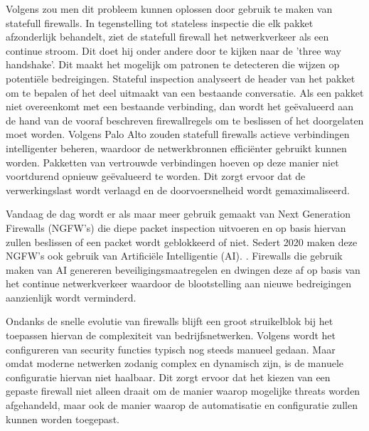 Volgens \textcite{paloAltoSF2025} zou men dit probleem kunnen oplossen door gebruik te maken van statefull firewalls. In tegenstelling tot stateless inspectie die elk pakket afzonderlijk behandelt, ziet de statefull firewall het netwerkverkeer als een continue stroom. Dit doet hij onder andere door te kijken naar de 'three way handshake'. Dit maakt het mogelijk om patronen te detecteren die wijzen op potentiële bedreigingen. Stateful inspection analyseert de header van het pakket om te bepalen of het deel uitmaakt van een bestaande conversatie. Als een pakket niet overeenkomt met een bestaande verbinding, dan wordt het geëvalueerd aan de hand van de vooraf beschreven firewallregels om te beslissen of het doorgelaten moet worden. Volgens Palo Alto zouden statefull firewalls actieve verbindingen intelligenter beheren, waardoor de netwerkbronnen efficiënter gebruikt kunnen worden. Pakketten van vertrouwde verbindingen hoeven op deze manier niet voortdurend opnieuw geëvalueerd te worden. Dit zorgt ervoor dat de verwerkingslast wordt verlaagd en de doorvoersnelheid wordt gemaximaliseerd. 

Vandaag de dag wordt er als maar meer gebruik gemaakt van Next Generation Firewalls (NGFW’s) die diepe packet inspection uitvoeren en op basis hiervan zullen beslissen of een packet wordt geblokkeerd of niet. Sedert 2020 maken deze NGFW’s ook gebruik van Artificiële Intelligentie (AI). \autocite{Ahmadi2023}. Firewalls die gebruik maken van AI genereren beveiligingsmaatregelen en dwingen deze af op basis van het continue netwerkverkeer waardoor de blootstelling aan nieuwe bedreigingen aanzienlijk wordt verminderd. \autocite{PaloAltoFW2024}

Ondanks de snelle evolutie van firewalls blijft een groot struikelblok bij het toepassen hiervan de complexiteit van bedrijfsnetwerken. Volgens \textcite{Bringhenti2023} wordt het configureren van security functies typisch nog steeds manueel gedaan. Maar omdat moderne netwerken zodanig complex en dynamisch zijn, is de manuele configuratie hiervan niet haalbaar. Dit zorgt ervoor dat het kiezen van een gepaste firewall niet alleen draait om de manier waarop mogelijke threats worden afgehandeld, maar ook de manier waarop de automatisatie en configuratie zullen kunnen worden toegepast.




